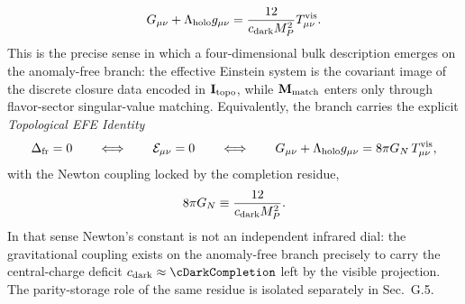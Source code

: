 \documentclass[11pt]{article}
\begin{document}
\begin{equation}
\label{eq:gravity-effective-einstein-local}
 G_{\mu\nu}+\Lambda_{\rm holo}g_{\mu\nu}
 =
 \frac{12}{c_{\rm dark}M_P^2}T^{\rm vis}_{\mu\nu}.
\end{equation}
This is the precise sense in which a four-dimensional bulk description emerges on the anomaly-free branch: the effective Einstein system is the covariant image of the discrete closure data encoded in $\mathbf I_{\rm topo}$, while $\mathbf M_{\rm match}$ enters only through flavor-sector singular-value matching. Equivalently, the branch carries the explicit \textit{Topological EFE Identity}
\begin{equation}
\label{eq:gravity-topological-efe-identity}
 \Delta_{\rm fr}=0
 \qquad\Longleftrightarrow\qquad
 \mathcal E_{\mu\nu}=0
 \qquad\Longleftrightarrow\qquad
 G_{\mu\nu}+\Lambda_{\rm holo}g_{\mu\nu}
 =
 8\pi G_N\,T^{\rm vis}_{\mu\nu},
\end{equation}
with the Newton coupling locked by the completion residue,
\begin{equation}
\label{eq:gravity-newton-lock-local}
 8\pi G_N
 \equiv
 \frac{12}{c_{\rm dark}M_P^2}.
\end{equation}
In that sense Newton's constant is not an independent infrared dial: the gravitational coupling exists on the anomaly-free branch precisely to carry the central-charge deficit $c_{\rm dark}\approx\cDarkCompletion$ left by the visible projection. The parity-storage role of the same residue is isolated separately in Sec.~G.5.
\end{document}
